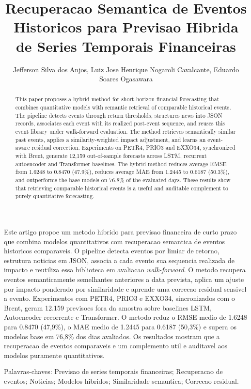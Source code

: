 \documentclass[12pt]{article}
\title{Recuperacao Semantica de Eventos Historicos para Previsao Hibrida de Series Temporais Financeiras}
\author{Jefferson Silva dos Anjos\inst{1}, Luiz Jose Henrique Nogaroli Cavalcante\inst{2}, Eduardo Soares Ogasawara\inst{3}}
\begin{document}
\maketitle

\begin{resumo}
Este artigo propoe um metodo hibrido para previsao financeira de curto prazo que combina modelos quantitativos com recuperacao semantica de eventos historicos comparaveis. O pipeline detecta eventos por limiar de retorno, estrutura noticias em JSON, associa a cada evento sua sequencia realizada de impacto e reutiliza essa biblioteca em avaliacao \textit{walk-forward}. O metodo recupera eventos semanticamente semelhantes anteriores a data prevista, aplica um ajuste por impacto ponderado por similaridade e aprende uma correcao residual sensivel a evento. Experimentos com PETR4, PRIO3 e EXXO34, sincronizados com o Brent, geram 12.159 previsoes fora da amostra sobre baselines LSTM, Autoencoder recorrente e Transformer. O metodo reduz o RMSE medio de 1.6248 para 0.8470 (47,9\%), o MAE medio de 1.2445 para 0.6187 (50,3\%) e supera os modelos base em 76,8\% dos dias avaliados. Os resultados mostram que a recuperacao de eventos comparaveis e um complemento util e auditavel aos modelos puramente quantitativos.
\end{resumo}

\begin{palavras-chave}
Palavras-chaves: Previsao de series temporais financeiras; Recuperacao de eventos; Noticias; Modelos hibridos; Similaridade semantica; Correcao residual.
\end{palavras-chave}

\begin{abstract}
This paper proposes a hybrid method for short-horizon financial forecasting that combines quantitative models with semantic retrieval of comparable historical events. The pipeline detects events through return thresholds, structures news into JSON records, associates each event with its realized post-event sequence, and reuses this event library under walk-forward evaluation. The method retrieves semantically similar past events, applies a similarity-weighted impact adjustment, and learns an event-aware residual correction. Experiments on PETR4, PRIO3 and EXXO34, synchronized with Brent, generate 12,159 out-of-sample forecasts across LSTM, recurrent autoencoder and Transformer baselines. The hybrid method reduces average RMSE from 1.6248 to 0.8470 (47.9\%), reduces average MAE from 1.2445 to 0.6187 (50.3\%), and outperforms the base models on 76.8\% of the evaluated days. These results show that retrieving comparable historical events is a useful and auditable complement to purely quantitative forecasting.
\end{abstract}
\end{document}
